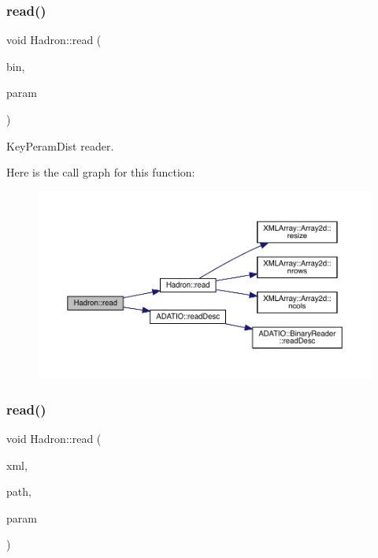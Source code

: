 \subsubsection{\texorpdfstring{read()}{read()}\hspace{0.1cm}{\footnotesize\ttfamily [29/94]}}
{\footnotesize\ttfamily void Hadron\+::read (\begin{DoxyParamCaption}\item[{\mbox{\hyperlink{classADATIO_1_1BinaryReader}{Binary\+Reader}} \&}]{bin,  }\item[{\mbox{\hyperlink{structHadron_1_1KeyPeramDist__t}{Key\+Peram\+Dist\+\_\+t}} \&}]{param }\end{DoxyParamCaption})}



Key\+Peram\+Dist reader. 

Here is the call graph for this function\+:\nopagebreak
\begin{figure}[H]
\begin{center}
\leavevmode
\includegraphics[width=350pt]{d1/daf/namespaceHadron_ac70286e9fd2f4a9ddf81f9235d1812e8_cgraph}
\end{center}
\end{figure}
\mbox{\label{namespaceHadron_a9c6649bbe7b32cbc5fcbf8ebbf17d987}} 
\subsubsection{\texorpdfstring{read()}{read()}\hspace{0.1cm}{\footnotesize\ttfamily [30/94]}}
{\footnotesize\ttfamily void Hadron\+::read (\begin{DoxyParamCaption}\item[{\mbox{\hyperlink{classADATXML_1_1XMLReader}{X\+M\+L\+Reader}} \&}]{xml,  }\item[{const std\+::string \&}]{path,  }\item[{\mbox{\hyperlink{structHadron_1_1KeyGenPropElementalOperator__t}{Key\+Gen\+Prop\+Elemental\+Operator\+\_\+t}} \&}]{param }\end{DoxyParamCaption})}



